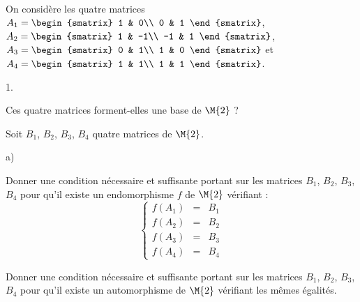 \documentclass[11pt]{article}%
\begin{document}
\begin{exerciceSP}~\\
  On considère les quatre matrices \quad $A_1 =
  \begin{smatrix}
    1 & 0\\
    0 & 1
  \end{smatrix}$, $A_2 =
  \begin{smatrix}
    1 & -1\\
    -1 & 1
  \end{smatrix}$, $A_3 = 
  \begin{smatrix}
    0 & 1\\
    1 & 0
  \end{smatrix}$ et $A_4 = 
  \begin{smatrix}
    1 & 1\\
    1 & 1
  \end{smatrix}$.
  \begin{noliste}{1.}
    \setlength{\itemsep}{2mm}
    \item Ces quatre matrices forment-elles une base de $\M{2}$ ?
    
    \item Soit $B_1$, $B_2$, $B_3$, $B_4$ quatre matrices de $\M{2}$.
    \begin{noliste}{a)}
    \setlength{\itemsep}{2mm}
      \item Donner une condition nécessaire et suffisante portant sur 
      les matrices $B_1$, $B_2$, $B_3$, $B_4$ pour qu'il existe un 
      endomorphisme $f$ de $\M{2}$ vérifiant :
      \[
        \left\{
        \begin{array}{rcl}
          f(A_1) & = & B_1\\
          f(A_2) & = & B_2\\
          f(A_3) & = & B_3\\
          f(A_4) & = & B_4
        \end{array}
        \right.
      \]
      
      \item Donner une condition nécessaire et suffisante portant sur 
      les matrices $B_1$, $B_2$, $B_3$, $B_4$ pour qu'il existe un 
      automorphisme de $\M{2}$ vérifiant les mêmes égalités.
    \end{noliste}
  \end{noliste}
\end{exerciceSP}



\end{document}
